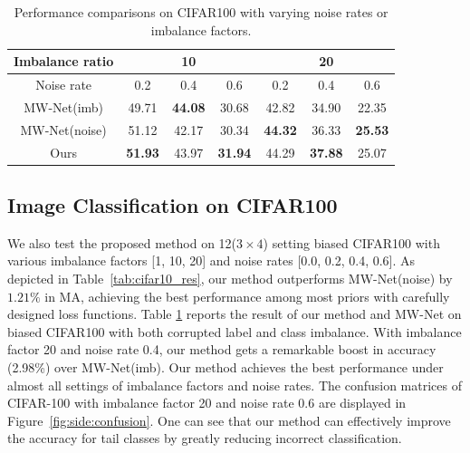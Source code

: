 \documentclass[letterpaper]{article} %
\begin{document}
\begin{table}[t]
\begin{center}
\begin{adjustbox}{max width=0.47\textwidth}
    \begin{tabular}{c|c|c|c|c|c|c}
    \hline
    Imbalance ratio &  \multicolumn{3}{c|}{10}    & \multicolumn{3}{c}{20} \\
    \hline
    Noise rate & 0.2   & 0.4   & \multicolumn{1}{c|}{0.6} & 0.2   & 0.4   & \multicolumn{1}{c}{0.6} \\
    \hline
    MW-Net(imb) & 49.71  & \textbf{44.08 } & 30.68  & 42.82  & 34.90  & 22.35  \\
    \hline
    MW-Net(noise) & 51.12  & 42.17  & 30.34  & \textbf{44.32}  & 36.33  & \textbf{25.53 } \\
    \hline
    Ours  & \textbf{51.93 } & 43.97  & \textbf{31.94 } & 44.29  & \textbf{37.88 } & 25.07  \\
    \hline
    \end{tabular}%
\end{adjustbox}
\vspace{-0.3cm}
\caption{Performance comparisons on CIFAR100 with varying noise rates or imbalance factors.
}
\label{tab:cifar100_res_d}
\vspace{-0.8cm}
\end{center}
\end{table}

\subsection{Image Classification on CIFAR100}
We also test the proposed method on 12($3 \times 4$) setting biased CIFAR100 with various imbalance factors [1, 10, 20] and noise rates [0.0, 0.2, 0.4, 0.6]. 
As depicted in Table~\ref{tab:cifar10_res}, our method outperforms MW-Net(noise) by $1.21\%$ in MA, achieving the best performance among most priors with carefully designed loss functions.
Table \ref{tab:cifar100_res_d} reports the result of our method and MW-Net on biased CIFAR100 with both corrupted label and class imbalance.
With imbalance factor 20 and noise rate 0.4, our method gets a remarkable boost in accuracy (2.98\%) over MW-Net(imb).
Our method achieves the best performance under almost all settings of imbalance factors and noise rates.
The confusion matrices of CIFAR-100 with imbalance factor 20 and noise rate 0.6 are displayed in Figure~\ref{fig:side:confusion}.
One can see that our method can effectively improve the accuracy for tail classes by greatly reducing incorrect classification.
\end{document}
